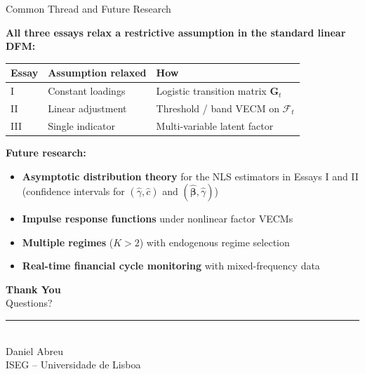 \documentclass{beamer}
\begin{document}
\begin{frame}{Common Thread and Future Research}

\textbf{All three essays relax a restrictive assumption in the standard linear DFM:}

\vspace{0.3em}
{\small
\begin{tabular}{lll}
\toprule
\textbf{Essay} & \textbf{Assumption relaxed} & \textbf{How} \\
\midrule
I   & Constant loadings     & Logistic transition matrix $\boldsymbol{G}_t$ \\
II  & Linear adjustment     & Threshold / band VECM on $\boldsymbol{\mathcal{F}}_t$ \\
III & Single indicator      & Multi-variable latent factor \\
\bottomrule
\end{tabular}
}

\vspace{0.5em}
\textbf{Future research:}
\begin{itemize}
  \item \textbf{Asymptotic distribution theory} for the NLS estimators in Essays I and II (confidence intervals for $(\hat\gamma,\hat c)$ and $(\hat{\boldsymbol{\beta}},\hat\gamma)$)
  \item \textbf{Impulse response functions} under nonlinear factor VECMs
  \item \textbf{Multiple regimes} ($K>2$) with endogenous regime selection
  \item \textbf{Real-time financial cycle monitoring} with mixed-frequency data
\end{itemize}

\end{frame}

\begin{frame}{}
\begin{center}
  \vspace{1.5em}
  {\LARGE\textcolor{isegblue}{\textbf{Thank You}}}\\[1.2em]
  {\large Questions?}\\[1.5em]
  \rule{0.5\textwidth}{0.4pt}\\[0.8em]
  {\small Daniel Abreu\\
  ISEG -- Universidade de Lisboa}
\end{center}
\end{frame}
\end{document}
